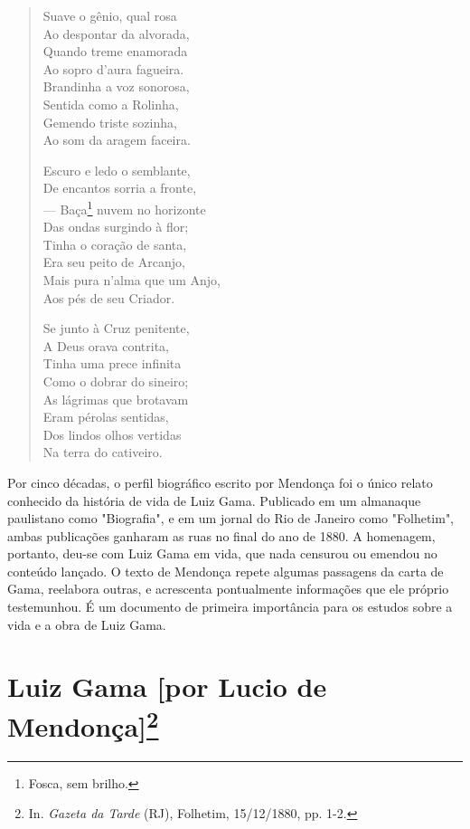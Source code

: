 \begin{verse}
Suave o gênio, qual rosa\\
Ao despontar da alvorada,\\
Quando treme enamorada\\
Ao sopro d'aura fagueira.\\
Brandinha a voz sonorosa,\\
Sentida como a Rolinha,\\
Gemendo triste sozinha,\\
Ao som da aragem faceira.

Escuro e ledo o semblante,\\
De encantos sorria a fronte,\\
--- Baça\footnote{Fosca, sem brilho.} nuvem no horizonte\\
Das ondas surgindo à flor;\\
Tinha o coração de santa,\\
Era seu peito de Arcanjo,\\
Mais pura n'alma que um Anjo,\\
Aos pés de seu Criador.

Se junto à Cruz penitente,\\
A Deus orava contrita,\\
Tinha uma prece infinita\\
Como o dobrar do sineiro;\\
As lágrimas que brotavam\\
Eram pérolas sentidas,\\
Dos lindos olhos vertidas\\
Na terra do cativeiro.
\end{verse}


\pagebreak
\mbox{}\vfill
\thispagestyle{empty}

{\small\noindent
Por cinco décadas, o perfil biográfico escrito por Mendonça foi o
único relato conhecido da história de vida de Luiz Gama. Publicado em um
almanaque paulistano como "Biografia", e em um jornal do Rio de Janeiro
como "Folhetim", ambas publicações ganharam as ruas no final do ano de
1880. A homenagem, portanto, deu-se com Luiz Gama em vida, que nada
censurou ou emendou no conteúdo lançado. O texto de Mendonça repete
algumas passagens da carta de Gama, reelabora outras, e acrescenta
pontualmente informações que ele próprio testemunhou. É um documento de
primeira importância para os estudos sobre a vida e a obra de Luiz Gama.
}

\chapter{Luiz Gama {[}por Lucio de Mendonça{]}\footnote[*]{In.
  \emph{Gazeta da Tarde} (RJ), Folhetim, 15/12/1880, pp. 1-2.}}


